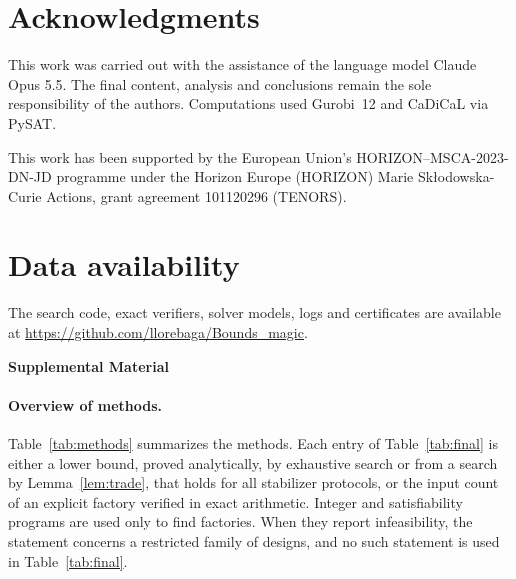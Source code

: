 \documentclass[aps,prl,reprint,twocolumn,amsmath,amssymb,floatfix,nofootinbib,superscriptaddress]{revtex4-2}
\begin{document}
\section*{Acknowledgments}
This work was carried out with the assistance of the language model Claude Opus 5.5. The final content, analysis and conclusions remain the sole responsibility of the authors. Computations used Gurobi~12 and CaDiCaL via PySAT.

This work has been supported by the European Union's HORIZON--MSCA-2023-DN-JD programme under the Horizon Europe (HORIZON) Marie Sk\l{}odowska-Curie Actions, grant agreement 101120296 (TENORS).

\section*{Data availability}
The search code, exact verifiers, solver models, logs and certificates are available at \url{https://github.com/llorebaga/Bounds_magic}.

%


\clearpage
\setcounter{secnumdepth}{2}\setcounter{section}{0}\setcounter{equation}{0}\setcounter{table}{0}\setcounter{figure}{0}
\renewcommand{\thesection}{S\arabic{section}}
\renewcommand{\theequation}{S\arabic{equation}}
\renewcommand{\thetable}{S\Roman{table}}
\renewcommand{\thefigure}{S\arabic{figure}}
\onecolumngrid
\begin{center}\textbf{\large Supplemental Material}\end{center}

\paragraph*{Overview of methods.}
Table~\ref{tab:methods} summarizes the methods. Each entry of Table~\ref{tab:final} is either a lower bound, proved analytically, by exhaustive search or from a search by Lemma~\ref{lem:trade}, that holds for all stabilizer protocols, or the input count of an explicit factory verified in exact arithmetic. Integer and satisfiability programs are used only to find factories. When they report infeasibility, the statement concerns a restricted family of designs, and no such statement is used in Table~\ref{tab:final}.
\end{document}
